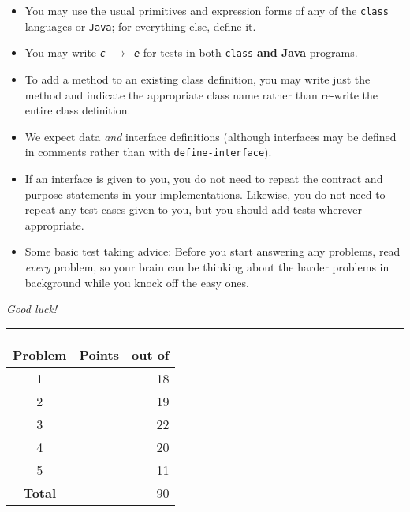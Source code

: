 \documentclass[12pt]{article}                   %
\newcommand\code[1]{\texttt{#1}}
\begin{document}
\noindent\begin{minipage}{8cm}\sloppy
\begin{itemize}
\item You may use the usual primitives and expression forms of any of
  the \code{class} languages or \code{Java}; for everything else,
  define it.

\item You may write {\tt {\slshape c} $\rightarrow$ {\slshape e}} for
  tests in both \code{class} \textbf{and Java} programs.

\item To add a method to an existing class definition, you
  may write just the method and indicate the appropriate class name
  rather than re-write the entire class definition.

\item We expect data \emph{and} interface definitions
  (although interfaces may be defined in comments rather than
  with \code{define-interface}).

\item If an interface is given to you, you do not need to repeat the
  contract and purpose statements in your implementations.  Likewise,
  you do not need to repeat any test cases given to you, but you
  should add tests wherever appropriate.


\item Some basic test taking advice: Before you start answering
any problems, read \emph{every} problem, so your brain can be thinking
about the harder problems in background while you knock off the easy ones.
\end{itemize}

\bigskip

\emph{Good luck!}
\end{minipage}\hfil\begin{minipage}[t]{6cm}
\rule{1cm}{0pt}\begin{tabular}{|c|l|@{/}r|}
\hline
{\bf Problem} & Points & out of \\ \hline
1 & & 18\\ \hline
2 & & 19\\ \hline
3 & & 22\\ \hline
4 & & 20\\ \hline
5 & & 11\\ \hline
{\bf Total} & & 90 \\ \hline
\end{tabular}
\end{minipage}
\end{document}

